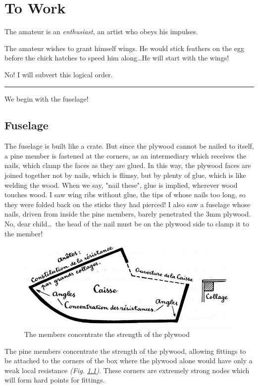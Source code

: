 \documentclass{book}
\newcommand*\sectline{
  \vspace{5pt}
  \begin{center}
    \rule{0.5\linewidth}{\linethickness}
  \end{center}
  \vspace{5pt}
}
\begin{document}
\chapter{To Work}

The amateur is an \textit{enthusiast}, an artist who obeys his
impulses.

The amateur wishes to grant himself wings. He would stick feathers on
the egg before the chick hatches to speed him along\ldots He will
start with the wings!

No!  I will subvert this logical order.

\sectline

We begin with the fuselage!

\section{Fuselage}

The fuselage is built like a crate. But since the plywood cannot be
nailed to itself, a pine member is fastened at the corners, as an
intermediary which receives the nails, which clamp the faces as they
are glued. In this way, the plywood faces are joined together not by
nails, which is flimsy, but by plenty of glue, which is like welding
the wood. When we say, "nail these", glue is implied, wherever wood
touches wood.  I saw wing ribs without glue, the tips of whose nails
too long, so they were folded back on the sticks they had pierced! I
also saw a fuselage whose nails, driven from inside the pine members,
barely penetrated the 3mm plywood.  No, dear child\ldots\ the head of
the nail must be on the plywood side to clamp it to the member!

\begin{figure}
  \includegraphics[width=\linewidth]{fig-15.jpg}
  \caption{The members concentrate the strength of the plywood}
  \label{fig:fifteen}
\end{figure}

The pine members concentrate the strength of the plywood, allowing
fittings to be attached to the corners of the box where the plywood
alone would have only a weak local resistance
\textit{(Fig. \ref{fig:fifteen})}. These corners are extremely strong nodes which
will form hard points for fittings.
\end{document}
